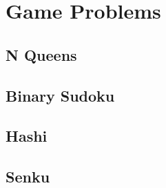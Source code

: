 \section{Game Problems}
\subsection{N Queens}

\subsection{Binary Sudoku}

\subsection{Hashi}

\subsection{Senku}